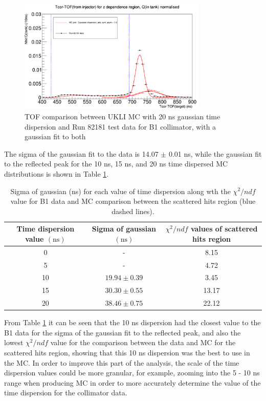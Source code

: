 \begin{figure}
    \centering
    \includegraphics[width=0.8\textwidth]{Figures/20ns_gaussian_dispersion_with_fit.PNG}
    \caption{TOF comparison between UKLI MC with 20 ns gaussian time dispersion and Run 82181 test data for B1 collimator, with a gaussian fit to both}
    \label{fig:20ns_time_dispersion}
\end{figure}


The sigma of the gaussian fit to the data is 14.07 $\pm$ 0.01 ns, while the gaussian fit to the reflected peak for the 10 ns, 15 ns, and 20 ns time dispersed MC distributions is shown in Table \ref{table:reflected_peak_gaussian}. 

\begin{table}[htp]
\centering
\begin{tabular}{||c|c|c||}
     \hline Time dispersion value $(\mathrm{ns})$ & Sigma of gaussian $(\mathrm{ns})$ & $\chi^2 / n d f$ values of scattered hits region \\
    \hline 0 & - & 8.15 \\
    \hline 5 & - & 4.72 \\
    \hline 10 & $19.94 \pm 0.39$ & 3.45 \\
    \hline 15 & $30.30 \pm 0.55$ & 13.17 \\
    \hline 20 & $38.46 \pm 0.75$ & 22.12 \\
    \hline 
\end{tabular}   
\caption{Sigma of gaussian (ns) for each value of time dispersion along wth the $\chi^2/ndf$ value for B1 data and MC comparison between the scattered hits region (blue dashed lines).} 
\label{table:reflected_peak_gaussian}
\end{table}

From Table \ref{table:reflected_peak_gaussian} it can be seen that the 10 ns dispersion had the closest value to the B1 data for the sigma of the gaussian fit to the reflected peak, and also the lowest $\chi^2/ndf$ value for the comparison between the data and MC for the scattered hits region, showing that this 10 ns dispersion was the best to use in the MC. In order to improve this part of the analysis, the scale of the time dispersion values could be more granular, for example, zooming into the 5 - 10 ns range when producing MC in order to more accurately determine the value of the time dispersion for the collimator data.

